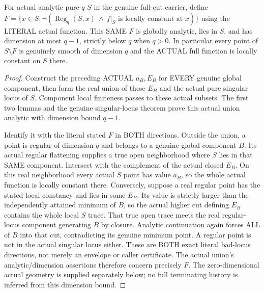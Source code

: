 \begin{theorem}
\label{hir:actual-full-value-smooth-local-constancy-bad-locus-analytic}
\leanok
For actual analytic pure-$q$ $S$ in the genuine full-cut carrier, define
$F=\{x\in S:\neg(\operatorname{Reg}_q(S,x)\ \land\ f|_S\text{ is locally constant at }x)\}$
using the LITERAL actual function. This SAME $F$ is globally analytic,
lies in $S$, and has dimension at most $q-1$, strictly below $q$ when $q>0$.
In particular every point of $S\setminus F$ is genuinely smooth of dimension
$q$ and the ACTUAL full function is locally constant on $S$ there.
\end{theorem}
\begin{proof}
Construct the preceding ACTUAL $a_B,E_B$ for EVERY genuine global component,
then form the real union of these $E_B$ and the actual pure singular locus
of $S$. Component local finiteness passes to these actual subsets. The first
two lemmas and the genuine singular-locus theorem prove this actual union
analytic with dimension bound $q-1$.

Identify it with the literal stated $F$ in BOTH directions. Outside the union,
a point is regular of dimension $q$ and belongs to a genuine global component
$B$. Its actual regular flattening supplies a true open neighborhood where
$S$ lies in that SAME component. Intersect with the complement of the actual
closed $E_B$. On this real neighborhood every actual $S$ point has value
$a_B$, so the whole actual function is locally constant there.
Conversely, suppose a real regular point has the stated local constancy and
lies in some $E_B$. Its value is strictly larger than the independently
attained minimum of $B$, so the actual higher cut defining $E_B$ contains
the whole local $S$ trace. That true open trace meets the real regular-locus
component generating $B$ by closure. Analytic continuation again forces ALL
of $B$ into that cut, contradicting its genuine minimum point. A regular
point is not in the actual singular locus either. These are BOTH exact
literal bad-locus directions, not merely an envelope or caller certificate.
The actual union's analytic/dimension assertions therefore concern precisely
$F$. The zero-dimensional actual geometry is supplied separately below;
no full terminating history is inferred from this dimension bound.
\end{proof}

